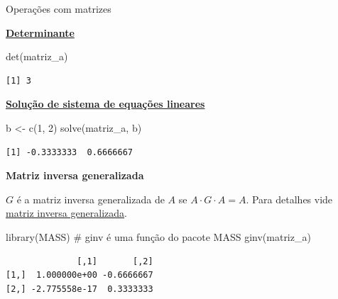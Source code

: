 \documentclass[
  10pt,
  ignorenonframetext,
]{beamer}
\newenvironment{Shaded}{\begin{snugshade}}{\end{snugshade}}
\newcommand{\CommentTok}[1]{\textcolor[rgb]{0.37,0.37,0.37}{#1}}
\newcommand{\DecValTok}[1]{\textcolor[rgb]{0.68,0.00,0.00}{#1}}
\newcommand{\FunctionTok}[1]{\textcolor[rgb]{0.28,0.35,0.67}{#1}}
\newcommand{\NormalTok}[1]{\textcolor[rgb]{0.00,0.23,0.31}{#1}}
\newcommand{\OtherTok}[1]{\textcolor[rgb]{0.00,0.23,0.31}{#1}}
\begin{document}
\begin{frame}[fragile]{Operações com matrizes}
\protect\hypertarget{operauxe7uxf5es-com-matrizes-3}{}
\small

\href{https://pt.wikipedia.org/wiki/Determinante}{\textbf{Determinante}}

\begin{Shaded}
\begin{Highlighting}[]
\FunctionTok{det}\NormalTok{(matriz\_a)}
\end{Highlighting}
\end{Shaded}

\begin{verbatim}
[1] 3
\end{verbatim}

\href{https://pt.wikipedia.org/wiki/Sistema_de_equações_lineares}{\textbf{Solução
de sistema de equações lineares}}

\begin{Shaded}
\begin{Highlighting}[]
\NormalTok{b }\OtherTok{\textless{}{-}} \FunctionTok{c}\NormalTok{(}\DecValTok{1}\NormalTok{, }\DecValTok{2}\NormalTok{)}
\FunctionTok{solve}\NormalTok{(matriz\_a, b)}
\end{Highlighting}
\end{Shaded}

\begin{verbatim}
[1] -0.3333333  0.6666667
\end{verbatim}

\textbf{Matriz inversa generalizada}

\(G\) é a matriz inversa generalizada de \(A\) se
\(A \cdot G \cdot A = A\). Para detalhes vide
\href{https://en.wikipedia.org/wiki/Generalized_inverse}{matriz inversa
generalizada}.

\begin{Shaded}
\begin{Highlighting}[]
\FunctionTok{library}\NormalTok{(MASS) }\CommentTok{\# ginv é uma função do pacote MASS}
\FunctionTok{ginv}\NormalTok{(matriz\_a)}
\end{Highlighting}
\end{Shaded}

\begin{verbatim}
              [,1]       [,2]
[1,]  1.000000e+00 -0.6666667
[2,] -2.775558e-17  0.3333333
\end{verbatim}

\normalsize
\end{frame}
\end{document}
